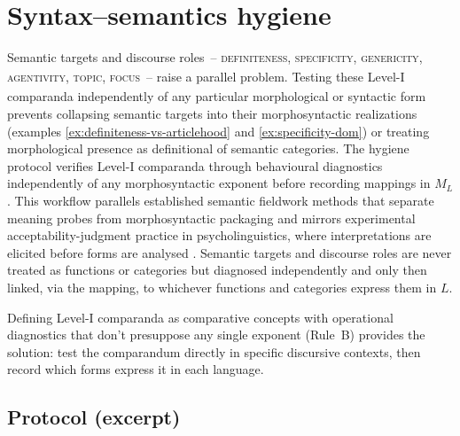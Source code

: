 \documentclass[12pt]{article}
\begin{document}
\section{Syntax--semantics hygiene}\label{sec:hygiene}

Semantic targets and discourse roles~-- \textsc{definiteness}\textsubscript{\Cross}, \textsc{specificity}\textsubscript{\Cross}, \textsc{genericity}\textsubscript{\Cross}, \textsc{agentivity}\textsubscript{\Cross}, \textsc{topic}\textsubscript{\Cross}, \textsc{focus}\textsubscript{\Cross}~-- raise a parallel problem. Testing these Level-I comparanda  independently of any particular morphological or syntactic form prevents collapsing semantic targets into their morphosyntactic realizations (examples \ref{ex:definiteness-vs-articlehood} and \ref{ex:specificity-dom}) or treating morphological presence as definitional of semantic categories. The hygiene protocol verifies Level-I comparanda  through behavioural diagnostics independently of any morphosyntactic exponent before recording mappings in $M_L$. This workflow parallels established semantic fieldwork methods that separate meaning probes from morphosyntactic packaging \parencite{Matthewson2004} and mirrors experimental acceptability-judgment practice in psycholinguistics, where interpretations are elicited before forms are analysed \parencite{Cowart1997,Schuetze1996}. Semantic targets and discourse roles are never treated as functions or categories but diagnosed independently and only then linked, via the mapping, to whichever functions and categories express them in $L$.

Defining Level-I comparanda as comparative concepts with operational diagnostics that don't presuppose any single exponent (Rule~B) provides the solution: test the comparandum directly in specific discursive contexts, then record which forms express it in each language.

\subsection{Protocol (excerpt)}\label{subsec:hygiene-protocol}
\end{document}

